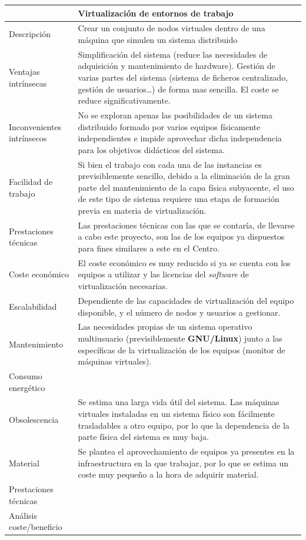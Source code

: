 \begin{table}
\begin{tabular}{|p{2.3cm}|p{12cm}|}
\hline
&\textbf{Virtualización de entornos de trabajo}\\%
\hline
Descripción&Crear un conjunto de nodos virtuales dentro de una máquina que simulen un sistema distribuido\\
\hline
Ventajas intrínsecas&Simplificación del sistema (reduce las necesidades de adquisición y mantenimiento de hardware). Gestión de varias partes del sistema (sistema de ficheros centralizado, gestión de usuarios\dots) de forma mas sencilla. El coste se reduce significativamente.\\
\hline
Inconvenientes intrínsecos&No se exploran apenas las posibilidades de un sistema distribuido formado por varios equipos físicamente independientes e impide aprovechar dicha independencia para los objetivos didácticos del sistema.\\
\hline
Facilidad de trabajo&Si bien el trabajo con cada una de las instancias es previsiblemente sencillo, debido a la eliminación de la gran parte del mantenimiento de la capa física subyacente, el uso de este tipo de sistema requiere una etapa de formación previa en materia de virtualización.\\
\hline
Prestaciones técnicas&Las prestaciones técnicas con las que se contaría, de llevarse a cabo este proyecto, son las de los equipos ya dispuestos para fines similares a este en el Centro.\\
\hline
Coste económico&El coste económico es muy reducido si ya se cuenta con los equipos a utilizar y las licencias del \textit{software} de virtualización necesarias.\\
\hline
Escalabilidad&Dependiente de las capacidades de virtualización del equipo disponible, y el número de nodos y usuarios a gestionar.\\
\hline
Mantenimiento&Las necesidades propias de un sistema operativo multiusuario (previsiblemente \textbf{GNU/Linux}) junto a las específicas de la virtualización de los equipos (monitor de máquinas virtuales).\\
\hline
Consumo energético&\\
\hline
Obsolescencia&Se estima una larga vida útil del sistema. Las máquinas virtuales instaladas en un sistema físico son fácilmente trasladables a otro equipo, por lo que la dependencia de la parte física del sistema es muy baja.\\
\hline
Material&Se plantea el aprovechamiento de equipos ya presentes en la infraestructura en la que trabajar, por lo que se estima un coste muy pequeño a la hora de adquirir material.\\
\hline
Prestaciones técnicas&\\
\hline
Análisis coste/beneficio&\\
\hline
\end{tabular}
\end{table}

